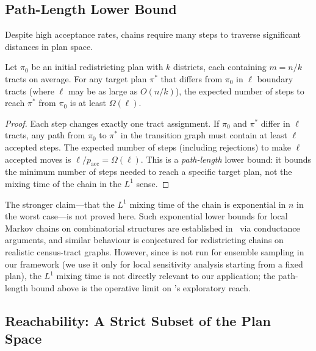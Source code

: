 \subsection{Path-Length Lower Bound}

Despite high acceptance rates, \flip{} chains require many steps to traverse
significant distances in plan space.

\begin{proposition}
\label{thm:slow-mix}
Let $\pi_0$ be an initial redistricting plan with $k$ districts, each
containing $m = n/k$ tracts on average.
For any target plan $\pi^*$ that differs from $\pi_0$ in $\ell$ boundary
tracts (where $\ell$ may be as large as $O(n/k)$), the expected number of
\flip{} steps to reach $\pi^*$ from $\pi_0$ is at least $\Omega(\ell)$.
\end{proposition}

\begin{proof}
Each \flip{} step changes exactly one tract assignment.
If $\pi_0$ and $\pi^*$ differ in $\ell$ tracts, any path from $\pi_0$ to
$\pi^*$ in the \flip{} transition graph must contain at least $\ell$ accepted
steps.
The expected number of steps (including rejections) to make $\ell$ accepted
moves is $\ell / p_{\mathrm{acc}} = \Omega(\ell)$.
This is a \emph{path-length} lower bound: it bounds the minimum number of
steps needed to reach a specific target plan, not the mixing time of the
chain in the $L^1$ sense.
\end{proof}

\begin{remark}
The stronger claim---that the $L^1$ mixing time of the \flip{} chain is
exponential in $n$ in the worst case---is not proved here.
Such exponential lower bounds for local Markov chains on combinatorial
structures are established in~\citet{sinclair1992} via conductance arguments,
and similar behaviour is conjectured for redistricting chains on realistic
census-tract graphs.
However, since \flip{} is not run for ensemble sampling in our framework
(we use it only for local sensitivity analysis starting from a fixed plan),
the $L^1$ mixing time is not directly relevant to our application; the
path-length bound above is the operative limit on \flip{}'s exploratory reach.
\end{remark}

\subsection{Reachability: A Strict Subset of the Plan Space}
\label{subsec:reachability}

